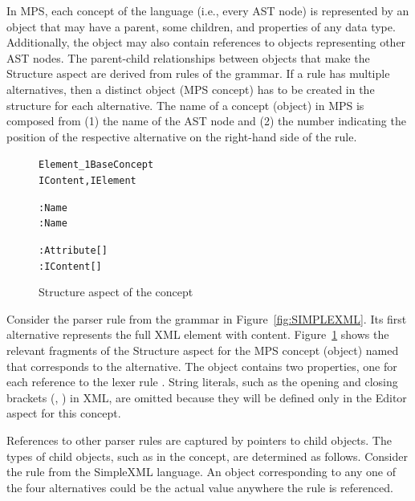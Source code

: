 In MPS, each concept of the language (i.e., every AST node) is represented by an object that may have a parent, some children, and properties of any data type.
Additionally, the object may also contain references to objects representing other AST nodes.
The parent-child relationships between objects that make the Structure aspect are derived from rules of the grammar.
If a rule has multiple alternatives, then a distinct object (MPS concept) has to be created in the structure for each alternative.
The name of a concept (object) in MPS is composed from (1) the name of the AST node and (2) the number indicating the position of the respective alternative on the right-hand side of the rule.

\begin{figure}[ht]
\vspace{-3mm}
\centering
\begin{alltt}
\small
{} Element\_1  BaseConcept
         IContent, IElement

   : Name
   : Name
  
   : Attribute[]
     : IContent[]
\end{alltt}
\caption{Structure aspect of the  concept}
\label{fig:ELEMENTSTRUCT}
\vspace{-1mm}
\end{figure}

Consider the parser rule  from the grammar in Figure~\ref{fig:SIMPLEXML}.
Its first alternative represents the full XML element with content.
Figure~\ref{fig:ELEMENTSTRUCT} shows the relevant fragments of the Structure aspect for the MPS concept (object) named  that corresponds to the alternative.
The object contains two properties, one for each reference to the lexer rule .
String literals, such as the opening and closing brackets (\antlrliteral{\textless}, \antlrliteral{/\textgreater}) in XML, are omitted because they will be defined only in the Editor aspect for this concept.

References to other parser rules are captured by pointers to child objects.
The types of child objects, such as  in the  concept, are determined as follows.
Consider the  rule from the SimpleXML language.
An object corresponding to any one of the four alternatives could be the actual value anywhere the  rule is referenced.

